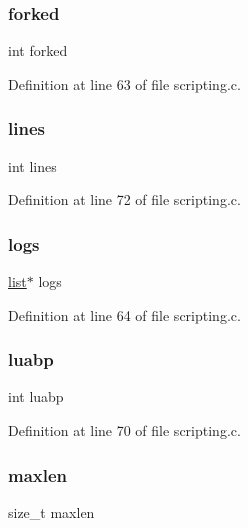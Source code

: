 \subsubsection{\texorpdfstring{forked}{forked}}
{\footnotesize\ttfamily int forked}



Definition at line 63 of file scripting.\+c.

\mbox{\label{structldb_state_a9921ae02cadccc99dd6c3a9b68be050a}} 
\subsubsection{\texorpdfstring{lines}{lines}}
{\footnotesize\ttfamily int lines}



Definition at line 72 of file scripting.\+c.

\mbox{\label{structldb_state_ad79d8838634104cbd0a2cc989b41017c}} 
\subsubsection{\texorpdfstring{logs}{logs}}
{\footnotesize\ttfamily \hyperlink{structlist}{list}$\ast$ logs}



Definition at line 64 of file scripting.\+c.

\mbox{\label{structldb_state_a74c70212af9085c6d321fa9ac33ae44c}} 
\subsubsection{\texorpdfstring{luabp}{luabp}}
{\footnotesize\ttfamily int luabp}



Definition at line 70 of file scripting.\+c.

\mbox{\label{structldb_state_a7eb7af5917b25bcb6565ab20f7a12d22}} 
\subsubsection{\texorpdfstring{maxlen}{maxlen}}
{\footnotesize\ttfamily size\+\_\+t maxlen}



